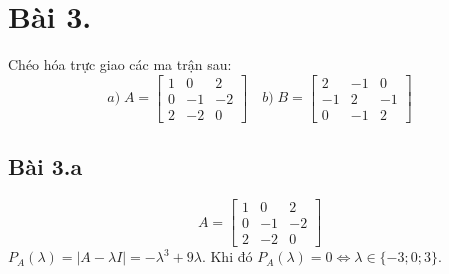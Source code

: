 \documentclass{article}
\begin{document}
\section*{Bài 3.} \large {Chéo hóa trực giao các ma trận sau:}
\[
    a) \; A =
    \begin{bmatrix}
        1 & 0 & 2 \\ 0 & -1 & -2 \\ 2 & -2 & 0
    \end{bmatrix}
    \quad
    b) \; B =
    \begin{bmatrix}
        2 & -1 & 0 \\ -1 & 2 & -1 \\ 0 & -1 & 2
    \end{bmatrix}
\]

\subsection*{Bài 3.a}
\[
    A =
    \begin{bmatrix}
        1 & 0 & 2 \\ 0 & -1 & -2 \\ 2 & -2 & 0
    \end{bmatrix}
\]
\( P_A(\lambda) = |A - \lambda I| = -\lambda^3 + 9\lambda.\)
\newline Khi đó \( P_{A}(\lambda) = 0 \Leftrightarrow \lambda \in \{ -3; 0; 3 \}. \)
\end{document}
